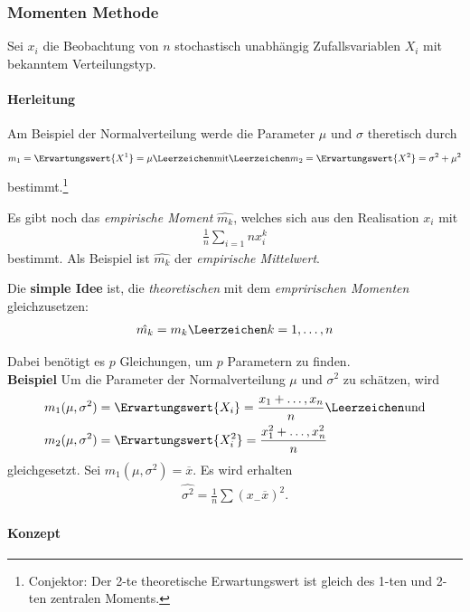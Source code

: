 \subsubsection{Momenten Methode}

Sei $x_i$ die Beobachtung von $n$ stochastisch unabhängig Zufallsvariablen $X_i$ mit bekanntem Verteilungstyp.\\
\paragraph{Herleitung}
Am Beispiel der Normalverteilung werde die Parameter $\mu$ und $\sigma$ theretisch durch 
\begin{align}
	m_1 = \Erwartungswert{X^1} = \mu \Leerzeichen \text{mit} \Leerzeichen m_2 = \Erwartungswert{X^2} = \sigma^2 + \mu^2
\end{align}
bestimmt.\footnote{Conjektor: Der 2-te theoretische Erwartungswert ist gleich des 1-ten und 2-ten zentralen Moments.}

Es gibt noch das \textit{empirische Moment} $\hat{m_k}$, welches sich aus den Realisation $x_i$ mit
\begin{align}
	\frac{1}{n}\sum_{i=1}{n}x_i^k 
\end{align}
bestimmt. Als Beispiel ist $\hat{m_k}$ der \textit{empirische Mittelwert}.

Die \textbf{simple Idee} ist, die \textit{theoretischen} mit dem \textit{empririschen Momenten} gleichzusetzen:
\begin{align}
	\hat{m_k} = m_k \Leerzeichen k = 1, \dots, n
\end{align}

Dabei benötigt es $p$ Gleichungen, um $p$ Parametern zu finden.\\

\textbf{Beispiel} Um die Parameter der Normalverteilung $\mu$ und $\sigma^2$ zu schätzen, wird
\begin{align}
	m_1(\mu, \sigma^2) &= \Erwartungswert{X_i} = \frac{x_1 + \dots, x_n}{n}\Leerzeichen \text{und}\\
	m_2(\mu, \sigma^2) &= \Erwartungswert{X_i^2} = \frac{x_1^2 + \dots, x_n^2}{n}
\end{align} gleichgesetzt. Sei $m_1(\mu, \sigma^2) = \overline{x}$. Es wird erhalten
\begin{align}
	\hat{\sigma^2} = \frac{1}{n}\sum (x_ - \overline{x})^2.
\end{align}
\paragraph{Konzept}

